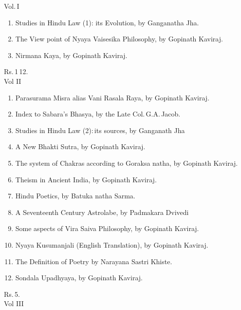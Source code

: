 \documentclass[11pt, openany]{book}
\begin{document}
\begin{sloppypar}
\noindent Vol.\,I\textendash 
\vspace{-2mm}

\begin{enumerate}[\indent(a)]
\setlength{\itemsep}{0pt}
\setlength{\parskip}{0pt}
\item Studies in Hindu Law (1): its Evolution, by Ganganatha Jha.
\item The View point of Nyaya Vaisesika Philosophy, by Gopinath Kaviraj.
\item Nirmana Kaya, by Gopinath Kaviraj.
\end{enumerate}
\vspace{-4mm}

\hfill Rs.\,1\textendash \,12.\\

\noindent Vol II\textendash 
\vspace{-2mm}

\begin{enumerate}[\indent(a)]
\setlength{\itemsep}{0pt}
\setlength{\parskip}{0pt}
\item Parasurama Misra alias Vani Rasala Raya, by Gopinath Kaviraj.
\item Index to Sabara's Bhasya, by the Late Col.\,G.A.\,Jacob.
\item Studies in Hindu Law (2):\textendash \,its sources, by Ganganath Jha
\item A New Bhakti Sutra, by Gopinath Kaviraj.
\item The system of Chakras according to Goraksa natha, by Gopinath Kaviraj.
\item Theism in Ancient India, by Gopinath Kaviraj.
\item Hindu Poetics, by Batuka natha Sarma.
\item A Seventeenth Century Astrolabe, by Padmakara Dvivedi
\item Some aspects of Vira Saiva Philosophy, by Gopinath Kaviraj.
\item Nyaya Kusumanjali (English Translation), by Gopinath Kaviraj.
\item The Definition of Poetry by Narayana Sastri Khiste.
\item Sondala Upadhyaya, by Gopinath Kaviraj.
\end{enumerate}
\vspace{-4mm}

\hfill Rs.\,5.\\

\noindent Vol III\textendash 
\vspace{-2mm}


\end{sloppypar}
\end{document}
